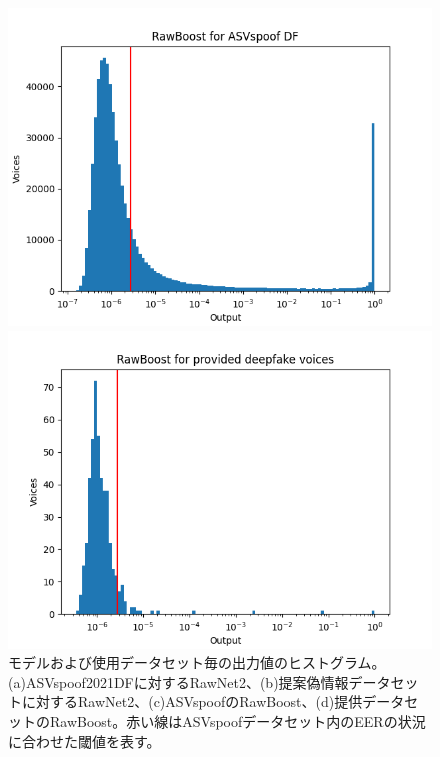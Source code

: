 \begin{figure}
\begin{minipage}[b]{0.45\hsize}
        \includegraphics[width=\linewidth]{figures/rawboost_asv.png} 
        \subcaption{}
    \end{minipage}
    \begin{minipage}[b]{0.45\hsize}
        \centering
        \includegraphics[width=\linewidth]{figures/rawboost_prop.png}
        \subcaption{}
    \end{minipage}
    \caption{モデルおよび使用データセット毎の出力値のヒストグラム。(a)ASVspoof2021DFに対するRawNet2、(b)提案偽情報データセットに対するRawNet2、(c)ASVspoofのRawBoost、(d)提供データセットのRawBoost。赤い線はASVspoofデータセット内のEERの状況に合わせた閾値を表す。}
    \label{fig:hist}
\end{figure}

